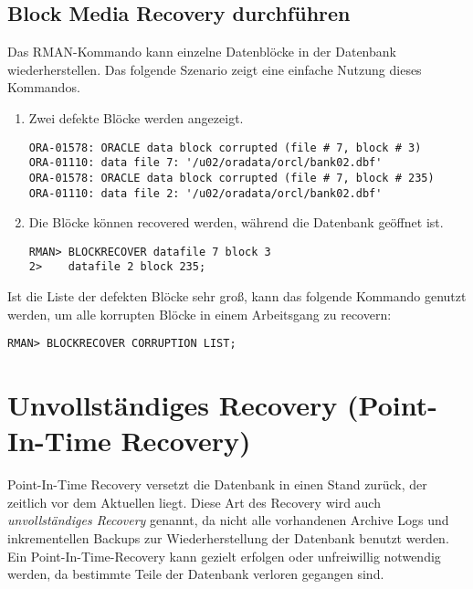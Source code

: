       \subsection{Block Media Recovery durchf\"uhren}
        Das RMAN-Kommando  kann einzelne Datenbl\"ocke in der Datenbank wiederherstellen. Das folgende Szenario zeigt eine einfache Nutzung dieses Kommandos.
        \begin{enumerate}
          \item Zwei defekte Bl\"ocke werden angezeigt.
          \begin{lstlisting}[caption={Der Fehler ORA-01578},label=admin1494,language=terminal]
ORA-01578: ORACLE data block corrupted (file # 7, block # 3)
ORA-01110: data file 7: '/u02/oradata/orcl/bank02.dbf'
ORA-01578: ORACLE data block corrupted (file # 7, block # 235)
ORA-01110: data file 2: '/u02/oradata/orcl/bank02.dbf'
          \end{lstlisting}
          \item Die Bl\"ocke k\"onnen recovered werden, w\"ahrend die Datenbank ge\"offnet ist.
          \begin{lstlisting}[caption={Das Kommando BLOCKRECOVER},label=admin1495,language=rman]
RMAN> BLOCKRECOVER datafile 7 block 3
2>    datafile 2 block 235;
          \end{lstlisting}
        \end{enumerate}
        Ist die Liste der defekten Bl\"ocke sehr gro\ss{}, kann das folgende Kommando genutzt werden, um alle korrupten Bl\"ocke in einem Arbeitsgang zu recovern:
          \begin{lstlisting}[caption={Das Kommando BLOCKRECOVER},label=admin1496,language=rman]
RMAN> BLOCKRECOVER CORRUPTION LIST;
          \end{lstlisting}
        \begin{literaturinternet}
          \item \cite{i1016424}
        \end{literaturinternet}
    \section{Unvollst\"andiges Recovery (Point-In-Time Recovery)}
      Point-In-Time Recovery versetzt die Datenbank in einen Stand zur\"uck, der zeitlich vor dem Aktuellen liegt. Diese Art des Recovery wird auch \textit{unvollst\"andiges Recovery} genannt, da nicht alle vorhandenen Archive Logs und inkrementellen Backups zur Wiederherstellung der Datenbank benutzt werden. Ein Point-In-Time-Recovery kann gezielt erfolgen oder unfreiwillig notwendig werden, da bestimmte Teile der Datenbank verloren gegangen sind.
